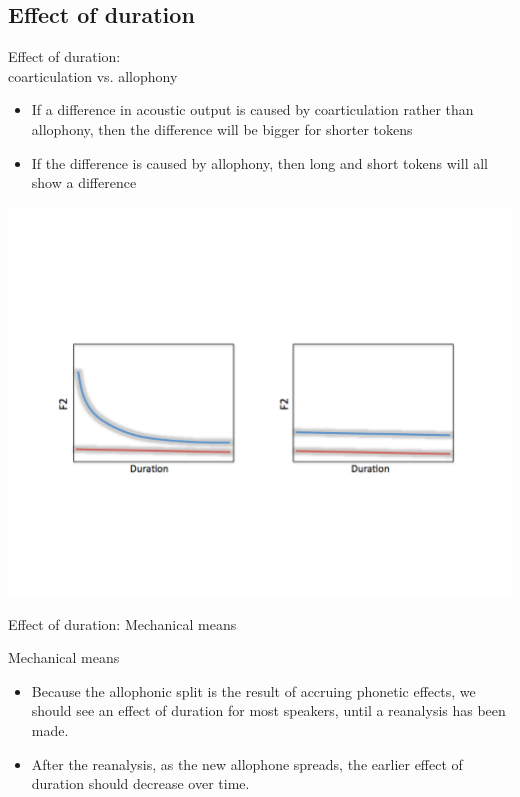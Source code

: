 \documentclass[hyperref={pdfpagelabels=false}]{beamer}
\begin{document}
\subsection{Effect of duration}
\begin{frame}{Effect of duration: \\ coarticulation vs. allophony}
	\begin{itemize} 
		\item If a difference in acoustic output is caused by coarticulation rather than allophony, then the difference will be bigger for shorter tokens
		\item If the difference is caused by allophony, then long and short tokens will all show a difference
	\end{itemize}
	\begin{center}

	\includegraphics[trim=2cm 2cm 2cm 6cm, clip=true, width=1\textwidth]{DurationEx.pdf}

\end{center}\end{frame}

\begin{frame}{Effect of duration: Mechanical means}
	\begin{block}{Mechanical means}
		\begin{itemize}
			\item Because the allophonic split is the result of accruing phonetic effects, we should see an effect of duration for most speakers, until a reanalysis has been made.
			\item After the reanalysis, as the new allophone spreads, the earlier effect of duration should decrease over time.
		\end{itemize}
	\end{block}	
\end{frame} 
\end{document}
